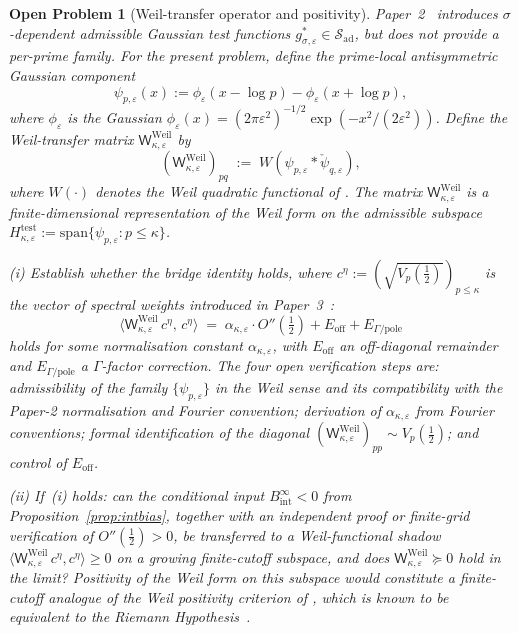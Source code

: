 \documentclass[11pt]{article}
\newtheorem{openproblem}[theorem]{Open Problem}
\begin{document}
\begin{openproblem}[Weil-transfer operator and positivity]
\label{op:weil}
Paper~2~\cite{Paper2} introduces $\sigma$-dependent admissible Gaussian
test functions $g^*_{\sigma,\varepsilon}\in\mathcal{S}_{\mathrm{ad}}$,
but does not provide a per-prime family.
For the present problem, define the prime-local antisymmetric
Gaussian component
\[
\psi_{p,\varepsilon}(x)
  := \phi_\varepsilon(x-\log p) - \phi_\varepsilon(x+\log p),
\]
where $\phi_\varepsilon$ is the Gaussian
$\phi_\varepsilon(x)=(2\pi\varepsilon^2)^{-1/2}\exp(-x^2/(2\varepsilon^2))$.
Define the \emph{Weil-transfer matrix}
$\mathsf{W}^{\mathrm{Weil}}_{\kappa,\varepsilon}$ by
\[
(\mathsf{W}^{\mathrm{Weil}}_{\kappa,\varepsilon})_{pq}
  \;:=\; W\!\left(\psi_{p,\varepsilon}\ast\check\psi_{q,\varepsilon}\right),
\]
where $W(\cdot)$ denotes the Weil quadratic functional of
\cite{Lagarias,Bombieri}.
The matrix $\mathsf{W}^{\mathrm{Weil}}_{\kappa,\varepsilon}$ is a finite-dimensional
representation of the Weil form on the admissible subspace
$H_{\kappa,\varepsilon}^{\mathrm{test}}
:=\mathrm{span}\{\psi_{p,\varepsilon}:p\le\kappa\}$.

\emph{(i)} Establish whether the bridge identity holds,
where $c^\eta:=(\sqrt{V_p(\tfrac12)})_{p\le\kappa}$ is the vector
of spectral weights introduced in Paper~3~\cite{Paper3}:
\[
\bigl\langle\mathsf{W}^{\mathrm{Weil}}_{\kappa,\varepsilon}\,c^\eta,\,c^\eta\bigr\rangle
  \;=\; \alpha_{\kappa,\varepsilon}\cdot O''\!\left(\tfrac12\right)
    + E_{\mathrm{off}} + E_{\Gamma/\mathrm{pole}}
\]
holds for some normalisation constant $\alpha_{\kappa,\varepsilon}$,
with $E_{\mathrm{off}}$ an off-diagonal remainder and
$E_{\Gamma/\mathrm{pole}}$ a $\Gamma$-factor correction.
The four open verification steps are:
admissibility of the family $\{\psi_{p,\varepsilon}\}$ in the Weil
sense and its compatibility with the Paper-2 normalisation and
Fourier convention;
derivation of $\alpha_{\kappa,\varepsilon}$ from Fourier conventions;
formal identification of the diagonal
$(\mathsf{W}^{\mathrm{Weil}}_{\kappa,\varepsilon})_{pp}\sim V_p(\tfrac12)$;
and control of $E_{\mathrm{off}}$.

\emph{(ii)} If~(i) holds:
can the conditional input $B_{\mathrm{int}}^\infty<0$ from
Proposition~\ref{prop:intbias}, together with an independent proof
or finite-grid verification of $O''(\tfrac12)>0$, be transferred to
a Weil-functional shadow
$\langle\mathsf{W}^{\mathrm{Weil}}_{\kappa,\varepsilon}\,c^\eta,c^\eta\rangle\ge 0$
on a growing finite-cutoff subspace, and does
$\mathsf{W}^{\mathrm{Weil}}_{\kappa,\varepsilon}\succeq 0$ hold in the limit?
Positivity of the Weil form on this subspace would constitute a
finite-cutoff analogue of the Weil positivity criterion of
\cite{Lagarias}, which is known to be equivalent to the
Riemann Hypothesis~\cite{Lagarias,Bombieri}.
\end{openproblem}
\end{document}
